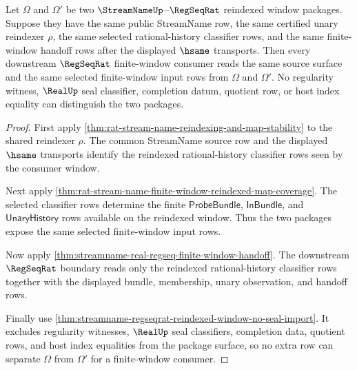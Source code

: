 \begin{theorem}
\label{thm:streamname-regseqrat-reindexed-window-consumer-determinacy}
Let $\Omega$ and $\Omega'$ be two
$\StreamNameUp$--$\RegSeqRat$ reindexed window packages. Suppose they have the
same public StreamName row, the same certified unary reindexer $\rho$, the same
selected rational-history classifier rows, and the same finite-window handoff
rows after the displayed $\hsame$ transports. Then every downstream
$\RegSeqRat$ finite-window consumer reads the same source surface and the same
selected finite-window input rows from $\Omega$ and $\Omega'$. No regularity
witness, $\RealUp$ seal classifier, completion datum, quotient row, or host
index equality can distinguish the two packages.
\end{theorem}
\begin{proof}
First apply \autoref{thm:rat-stream-name-reindexing-and-map-stability} to the
shared reindexer $\rho$. The common StreamName source row and the displayed
$\hsame$ transports identify the reindexed rational-history classifier rows
seen by the consumer window.

Next apply \autoref{thm:rat-stream-name-finite-window-reindexed-map-coverage}.
The selected classifier rows determine the finite $\mathsf{ProbeBundle}$,
$\mathsf{InBundle}$, and $\mathsf{UnaryHistory}$ rows available on the
reindexed window. Thus the two packages expose the same selected finite-window
input rows.

Now apply \autoref{thm:streamname-real-regseq-finite-window-handoff}. The
downstream $\RegSeqRat$ boundary reads only the reindexed rational-history
classifier rows together with the displayed bundle, membership, unary
observation, and handoff rows.

Finally use
\autoref{thm:streamname-regseqrat-reindexed-window-no-seal-import}. It excludes
regularity witnesses, $\RealUp$ seal classifiers, completion data, quotient
rows, and host index equalities from the package surface, so no extra row can
separate $\Omega$ from $\Omega'$ for a finite-window consumer.
\end{proof}

